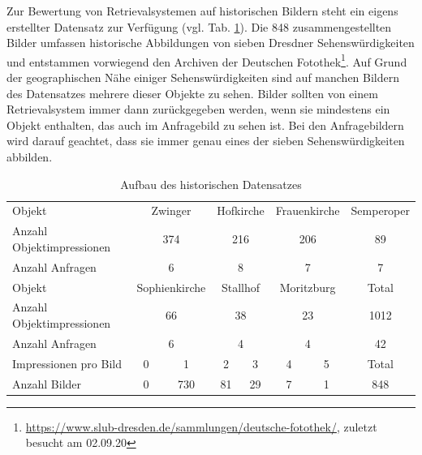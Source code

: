 Zur Bewertung von Retrievalsystemen auf historischen Bildern steht ein eigens erstellter Datensatz zur Verfügung (vgl. Tab. \ref{hist4d_data}). Die 848 zusammengestellten Bilder umfassen historische Abbildungen von sieben Dresdner Sehenswürdigkeiten und entstammen vorwiegend den Archiven der Deutschen Fotothek\footnote{\url{https://www.slub-dresden.de/sammlungen/deutsche-fotothek/}, zuletzt besucht am 02.09.20}. Auf Grund der geographischen Nähe einiger Sehenswürdigkeiten sind auf manchen Bildern des Datensatzes mehrere dieser Objekte zu sehen. Bilder sollten von einem Retrievalsystem immer dann zurückgegeben werden, wenn sie mindestens ein Objekt enthalten, das auch im Anfragebild zu sehen ist. Bei den Anfragebildern wird darauf geachtet, dass sie immer genau eines der sieben Sehenswürdigkeiten abbilden.
\\
\begin{table}[h]
\centering

\begin{tabular}{l|c|c|c|c|c|c|c}
\rowcolor[HTML]{C0C0C0} 
Objekt &
  \multicolumn{2}{c|}{\cellcolor[HTML]{C0C0C0}Zwinger} &
  \multicolumn{2}{c|}{\cellcolor[HTML]{C0C0C0}Hofkirche} &
  \multicolumn{2}{c|}{\cellcolor[HTML]{C0C0C0}Frauenkirche} &
  Semperoper \\
Anzahl Objektimpressionen & \multicolumn{2}{c|}{374} & \multicolumn{2}{c|}{216} & \multicolumn{2}{c|}{206} & 89    \\
Anzahl Anfragen           & \multicolumn{2}{c|}{6}   & \multicolumn{2}{c|}{8}   & \multicolumn{2}{c|}{7}   & 7     \\ \hline
\rowcolor[HTML]{C0C0C0} 
Objekt &
  \multicolumn{2}{c|}{\cellcolor[HTML]{C0C0C0}Sophienkirche} &
  \multicolumn{2}{c|}{\cellcolor[HTML]{C0C0C0}Stallhof} &
  \multicolumn{2}{c|}{\cellcolor[HTML]{C0C0C0}Moritzburg} &
  Total \\
Anzahl Objektimpressionen & \multicolumn{2}{c|}{66}  & \multicolumn{2}{c|}{38}  & \multicolumn{2}{c|}{23}  & 1012  \\
Anzahl Anfragen           & \multicolumn{2}{c|}{6}   & \multicolumn{2}{c|}{4}   & \multicolumn{2}{c|}{4}   & 42    \\ \hline
\rowcolor[HTML]{C0C0C0} 
Impressionen pro Bild     & \hspace{2.5mm} 0 \hspace{2.5mm}         & 1           & \hspace{1.1mm} 2 \hspace{1.1mm}           & 3          & \hspace{2mm} 4 \hspace{2mm}           & 5          & Total \\
Anzahl Bilder             & 0          & 730         & 81          & 29         & 7           & 1          & 848  
\end{tabular}%

\caption{Aufbau des historischen Datensatzes}
\label{hist4d_data}
\end{table}
